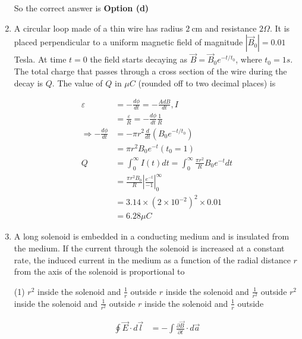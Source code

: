 \begin{enumerate}
\begin{tasks}
	\end{tasks}
\begin{answer}
	So the correct answer is \textbf{Option (d)}
\end{answer}
	\item A circular loop made of a thin wire has radius $2 \mathrm{~cm}$ and resistance $2 \Omega$. It is placed perpendicular to a uniform magnetic field of magnitude $\left|\vec{B}_{0}\right|=0.01$ Tesla. At time $t=0$ the field starts decaying as $\vec{B}=\vec{B}_{0} e^{-t / t_{0}}$, where $t_{0}=1 s$. The total charge that passes through a cross section of the wire during the decay is $Q$. The value of $Q$ in $\mu C$ (rounded off to two decimal places) is
	{}
	\begin{answer}
		\begin{align*}
		\varepsilon&=-\frac{d \phi}{d t}=-\frac{A d B}{d t}, I\\&=\frac{\varepsilon}{R}=-\frac{d \phi}{d t} \frac{1}{R}\\
		\Rightarrow-\frac{d \phi}{d t}&=-\pi r^{2} \frac{d}{d t}\left(B_{0} e^{-t / t_{0}}\right)\\&=\pi r^{2} B_{0} e^{-t}\left(t_{0}=1\right)\\
		Q&=\int_{0}^{\infty} I(t) d t=\int_{0}^{\infty} \frac{\pi r^{2}}{R} B_{0} e^{-t} d t\\&=\frac{\pi r^{2} B_{0}}{R}\left|\frac{e^{-t}}{-1}\right|_{0}^{\infty}\\
		&=3.14 \times\left(2 \times 10^{-2}\right)^{2} \times 0.01\\&=6.28 \mu C
		\end{align*}
	\end{answer}
	\item A long solenoid is embedded in a conducting medium and is insulated from the medium. If the current through the solenoid is increased at a constant rate, the induced current in the medium as a function of the radial distance $r$ from the axis of the solenoid is proportional to
	{}
	\begin{tasks}(1)
		\task[\textbf{a.}] $r^{2}$ inside the solenoid and $\frac{1}{r}$ outside
		\task[\textbf{b.}]$r$ inside the solenoid and $\frac{1}{r^{2}}$ outside
		\task[\textbf{c.}]$r^{2}$ inside the solenoid and $\frac{1}{r^{2}}$ outside
		\task[\textbf{d.}] $r$ inside the solenoid and $\frac{1}{r}$ outside
	\end{tasks}
\begin{answer}
	\begin{align*}
	\oint \vec{E} \cdot d \vec{l}&=-\int \frac{\partial \vec{B}}{\partial t} \cdot d \vec{a}\\

\end{align*}
\end{answer}
\end{enumerate}
